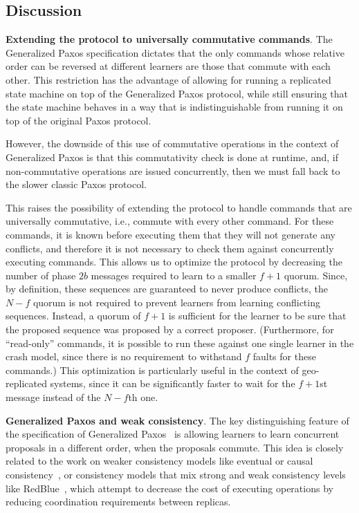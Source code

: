 \subsection{Discussion}
\label{sec:disc}

\noindent \textbf{Extending the protocol to universally commutative commands}.
The Generalized Paxos specification dictates that the only commands
whose relative order can be reversed at different learners are those
that commute with each other. This restriction has the advantage of
allowing for running a replicated state machine on top of the
Generalized Paxos protocol, while still ensuring that the state
machine behaves in a way that is indistinguishable from running it on
top of the original Paxos protocol.

However, the downside of this use of commutative operations in the
context of Generalized Paxos is that this commutativity check is done
at runtime, and, if non-commutative operations are issued
concurrently, then we must fall back to the slower
classic Paxos protocol.

This raises the possibility of extending the protocol to handle
commands that are universally commutative, i.e., commute with every
other command. For these commands, it is known before executing them
that they will not generate any conflicts, and therefore it is not
necessary to check them against concurrently executing commands.  This
allows us to optimize the protocol by decreasing the number of phase
$2b$ messages required to learn to a smaller $f+1$ quorum. Since, by
definition, these sequences are guaranteed to never produce conflicts,
the $N-f$ quorum is not required to prevent learners from learning
conflicting sequences. Instead, a quorum of $f+1$ is sufficient for
the learner to be sure that the proposed sequence was proposed by a
correct proposer. (Furthermore, for ``read-only'' commands, it is possible to run these
against one single learner in the crash model, since there is no
requirement to withstand $f$ faults for these commands.)
This optimization is particularly useful in the context of 
geo-replicated systems, since it can be significantly faster
to wait for the $f+1$st message instead of the $N-f$th one.


\noindent \textbf{Generalized Paxos and weak consistency}.
The key distinguishing feature of the specification of Generalized
Paxos~\cite{Lamport2005} is allowing learners to learn concurrent
proposals in a different order, when the proposals commute. This idea
is closely related to the work on weaker consistency models like eventual or
causal consistency~\cite{Ahamad1995}, or consistency models that mix
strong and weak consistency levels like RedBlue~\cite{Li2012}, which attempt
to decrease the cost of executing operations by reducing coordination
requirements between replicas. 

